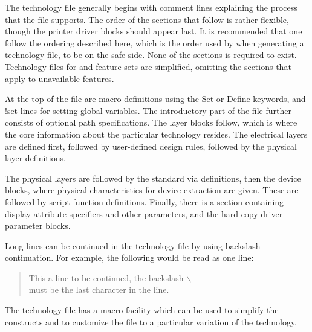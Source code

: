 The technology file generally begins with comment lines explaining the
process that the file supports.  The order of the sections that follow
is rather flexible, though the printer driver blocks should appear
last.  It is recommended that one follow the ordering described here,
which is the order used by {\Xic} when generating a technology file,
to be on the safe side.  None of the sections is required to exist. 
Technology files for {\XicII} and {\Xiv} feature sets are simplified,
omitting the sections that apply to unavailable features.

At the top of the file are macro definitions using the {\vt Set} or
{\vt Define} keywords, and {\cb !set} lines for setting global
variables.  The introductory part of the file further consists of
optional path specifications.  The layer blocks follow, which is where
the core information about the particular technology resides.  The
electrical layers are defined first, followed by user-defined design
rules, followed by the physical layer definitions.

The physical layers are followed by the standard via definitions, then
the device blocks, where physical characteristics for device
extraction are given.  These are followed by script function
definitions.  Finally, there is a section containing display attribute
specifiers and other parameters, and the hard-copy driver parameter
blocks.

Long lines can be continued in the technology file by using backslash
continuation.  For example, the following would be read as one line:
\begin{samepage}
\begin{quote}\vt
    This a line to be continued, the backslash $\backslash$ \\
    must be the last character in the line.
\end{quote}
\end{samepage}

The technology file has a macro facility which can be used to simplify
the constructs and to customize the file to a particular variation of
the technology.

